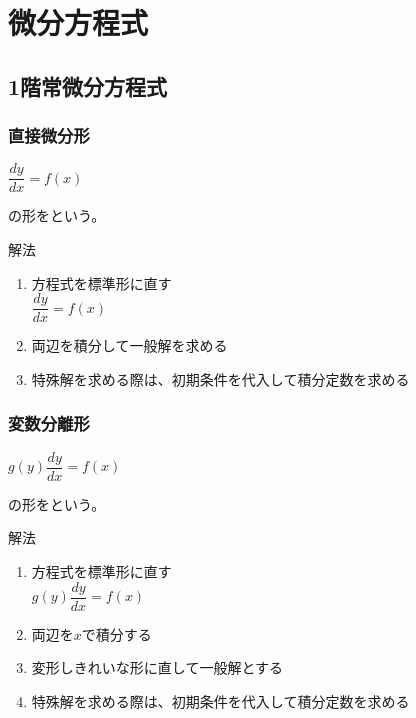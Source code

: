 \documentclass[a4paper]{jsarticle}
\begin{document}
\section{微分方程式}
\subsection{1階常微分方程式}
\subsubsection{直接微分形}
\begin{center}
    $\dfrac{dy}{dx}=f\left(x\right)$
\end{center}
の形をという。
\begin{itembox}[l]{解法}
    \begin{enumerate}[(1)]
        \item 方程式を標準形に直す\\
              $\dfrac{dy}{dx}=f\left(x\right)$
        \item 両辺を積分して一般解を求める
        \item 特殊解を求める際は、初期条件を代入して積分定数を求める
    \end{enumerate}
\end{itembox}
\subsubsection{変数分離形}
\begin{center}
    $g\left(y\right)\dfrac{dy}{dx}=f\left(x\right)$
\end{center}
の形をという。
\begin{itembox}[l]{解法}
    \begin{enumerate}[(1)]
        \item 方程式を標準形に直す\\
              $g\left(y\right)\dfrac{dy}{dx}=f\left(x\right)$
        \item 両辺を$x$で積分する
        \item 変形しきれいな形に直して一般解とする
        \item 特殊解を求める際は、初期条件を代入して積分定数を求める
    \end{enumerate}
\end{itembox}
\end{document}
